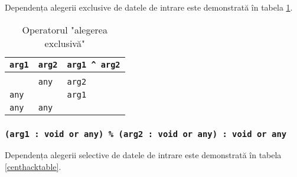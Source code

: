 Dependența alegerii exclusive de datele de intrare este demonstrată în tabela \ref{xorhacktable}.

\begin{table}[htb]
	\caption{Operatorul "alegerea exclusivă"}
	\label{xorhacktable}
	\begin{tabular}{|l|l|l|}
		\hline
		\texttt{arg1} & \texttt{arg2} & \texttt{arg1 ^ arg2} \\ \hline
		\void{}     & \void{}     & \void{}   			\\ \hline
		\void{}     & \texttt{any}  & \texttt{arg2}   		\\ \hline
		\texttt{any}  & \void{}     & \texttt{arg1}   		\\ \hline
		\texttt{any}  & \texttt{any}  & \void{}   			\\ \hline
	\end{tabular}
	\vspace{0em}
\end{table}

\subsubsection{\texttt{(arg1 : void or any) \% (arg2 : void or any) : void or any}}

Dependența alegerii selective de datele de intrare este demonstrată în tabela \ref{centhacktable}.

